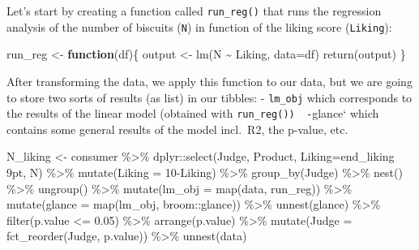 \documentclass[
]{book}
\newenvironment{Shaded}{\begin{snugshade}}{\end{snugshade}}
\newcommand{\AttributeTok}[1]{\textcolor[rgb]{0.77,0.63,0.00}{#1}}
\newcommand{\ControlFlowTok}[1]{\textcolor[rgb]{0.13,0.29,0.53}{\textbf{#1}}}
\newcommand{\DecValTok}[1]{\textcolor[rgb]{0.00,0.00,0.81}{#1}}
\newcommand{\FloatTok}[1]{\textcolor[rgb]{0.00,0.00,0.81}{#1}}
\newcommand{\FunctionTok}[1]{\textcolor[rgb]{0.00,0.00,0.00}{#1}}
\newcommand{\NormalTok}[1]{#1}
\newcommand{\OtherTok}[1]{\textcolor[rgb]{0.56,0.35,0.01}{#1}}
\newcommand{\SpecialCharTok}[1]{\textcolor[rgb]{0.00,0.00,0.00}{#1}}
\newcommand{\StringTok}[1]{\textcolor[rgb]{0.31,0.60,0.02}{#1}}
\begin{document}
Let's start by creating a function called \texttt{run\_reg()} that runs the regression analysis of the number of biscuits (\texttt{N}) in function of the liking score (\texttt{Liking}):

\begin{Shaded}
\begin{Highlighting}[]
\NormalTok{run\_reg }\OtherTok{\textless{}{-}} \ControlFlowTok{function}\NormalTok{(df)\{}
\NormalTok{  output }\OtherTok{\textless{}{-}} \FunctionTok{lm}\NormalTok{(N }\SpecialCharTok{\textasciitilde{}}\NormalTok{ Liking, }\AttributeTok{data=}\NormalTok{df)}
  \FunctionTok{return}\NormalTok{(output)}
\NormalTok{\}}
\end{Highlighting}
\end{Shaded}

After transforming the data, we apply this function to our data, but we are going to store two sorts of results (as list) in our tibbles:
- \texttt{lm\_obj} which corresponds to the results of the linear model (obtained with \texttt{run\_reg()\textasciigrave{}\textasciigrave{})\ \ -}glance` which contains some general results of the model incl.~R2, the p-value, etc.

\begin{Shaded}
\begin{Highlighting}[]
\NormalTok{N\_liking }\OtherTok{\textless{}{-}}\NormalTok{ consumer }\SpecialCharTok{\%\textgreater{}\%} 
\NormalTok{  dplyr}\SpecialCharTok{::}\FunctionTok{select}\NormalTok{(Judge, Product, }\AttributeTok{Liking=}\StringTok{\textasciigrave{}}\AttributeTok{end\_liking 9pt}\StringTok{\textasciigrave{}}\NormalTok{, N) }\SpecialCharTok{\%\textgreater{}\%} 
  \FunctionTok{mutate}\NormalTok{(}\AttributeTok{Liking =} \DecValTok{10}\SpecialCharTok{{-}}\NormalTok{Liking) }\SpecialCharTok{\%\textgreater{}\%} 
  \FunctionTok{group\_by}\NormalTok{(Judge) }\SpecialCharTok{\%\textgreater{}\%}
  \FunctionTok{nest}\NormalTok{() }\SpecialCharTok{\%\textgreater{}\%}
  \FunctionTok{ungroup}\NormalTok{() }\SpecialCharTok{\%\textgreater{}\%}
  \FunctionTok{mutate}\NormalTok{(}\AttributeTok{lm\_obj =} \FunctionTok{map}\NormalTok{(data, run\_reg)) }\SpecialCharTok{\%\textgreater{}\%} 
  \FunctionTok{mutate}\NormalTok{(}\AttributeTok{glance =} \FunctionTok{map}\NormalTok{(lm\_obj, broom}\SpecialCharTok{::}\NormalTok{glance)) }\SpecialCharTok{\%\textgreater{}\%} 
  \FunctionTok{unnest}\NormalTok{(glance) }\SpecialCharTok{\%\textgreater{}\%} 
  \FunctionTok{filter}\NormalTok{(p.value }\SpecialCharTok{\textless{}=} \FloatTok{0.05}\NormalTok{) }\SpecialCharTok{\%\textgreater{}\%} 
  \FunctionTok{arrange}\NormalTok{(p.value) }\SpecialCharTok{\%\textgreater{}\%} 
  \FunctionTok{mutate}\NormalTok{(}\AttributeTok{Judge =} \FunctionTok{fct\_reorder}\NormalTok{(Judge, p.value)) }\SpecialCharTok{\%\textgreater{}\%} 
  \FunctionTok{unnest}\NormalTok{(data)}
\end{Highlighting}
\end{Shaded}
\end{document}
